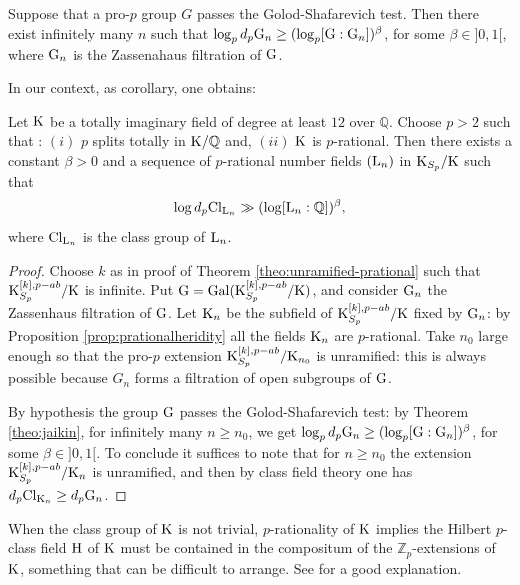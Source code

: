 \documentclass[12pt,a4paper,twoside,english]{smfart}
\def\Q{{\mathbb Q}}
\def\Z{{\mathbb Z}}
\def\G{{\rm G}}
\def\HH{{\rm H}}
\def\K{{\rm K}}
\def\L{{\rm L}}
\def\Gal{{\rm Gal}}
\def\Cl{{\rm Cl}}
\begin{document}
 \begin{theo} \label{theo:jaikin}
 Suppose that a pro-$p$ group $G$ passes the Golod-Shafarevich  test. Then
 there exist infinitely many $n$ such that $\log_p  d_p \G_n  \geq (\log_p [\G:\G_n])^\beta $, for some $\beta \in ]0,1[$, where $\G_n$ is the Zassenahaus filtration of $\G$.
 \end{theo} 
 
 
 
 In our context, as corollary, one obtains:
 
 \begin{coro}
 Let $\K$  be a totally imaginary field of degree at least $12$ over $\Q$. Choose $p>2$ such that : $(i)$ $p$ splits totally in $\K/\Q$ and, $(ii)$ $\K$ is $p$-rational.
Then there exists a constant $\beta >0$ and a sequence of  $p$-rational number fields $(\L_n)$ in $\K_{S_p}/\K$ such that $$\log d_p \Cl_{\L_n} \gg (\log [\L_n:\Q])^\beta,$$
where $\Cl_{\L_n}$ is the class group of $\L_n$. 
 \end{coro}
 
 \begin{proof}Choose $k$ as in proof of Theorem \ref{theo:unramified-prational} such that $\K_{S_p}^{[k],p-ab}/\K$ is infinite. Put $\G=\Gal(\K_{S_p}^{[k],p-ab}/\K)$, and consider $\G_n$ the Zassenhaus filtration of $\G$. Let $\K_n$ be the subfield of $\K_{S_p}^{[k],p-ab}/\K $ fixed by $\G_n$: by Proposition \ref{prop:prationalheridity} all the fields $\K_n$  are $p$-rational. Take $n_0$  large enough so that  the pro-$p$ extension $\K_{S_p}^{[k],p-ab}/\K_{n_0}$ is unramified: this is always possible because $G_n$ forms a filtration of open subgroups of $\G$.

By hypothesis the group $\G$ passes the Golod-Shafarevich test: by Theorem \ref{theo:jaikin}, for infinitely many $n\geq n_0$,  we get  $\log_p  d_p \G_n  \geq (\log_p [\G:\G_n])^\beta $, for some $\beta \in ]0,1[$. To conclude it suffices to note that  for $n\geq n_0$ the extension
  $\K_{S_p}^{[k],p-ab}/\K_n$ is unramified, and then by class field theory one has $d_p \Cl_{\K_n} \geq d_p \G_n$.
 \end{proof}
 
 \begin{rema}
 When the class group of $\K$ is not trivial, $p$-rationality of $\K$ implies the Hilbert $p$-class field $\HH$ of $\K$ must be contained 
in the compositum of the $\Z_p$-extensions of $\K$,  something that can be difficult to arrange. See \cite[Chapter IV, \S 3]{gras} for a good explanation.
 \end{rema}
 
\end{document}
